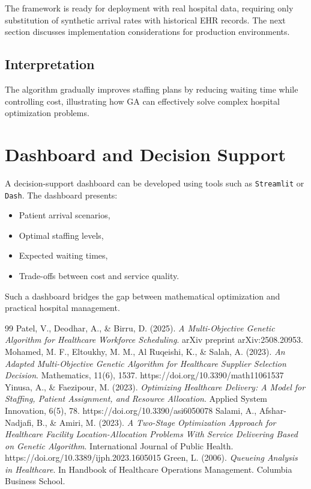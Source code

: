 \documentclass[12pt,a4paper]{article}
\begin{document}
	The framework is ready for deployment with real hospital data, requiring only substitution of synthetic arrival rates with historical EHR records. The next section discusses implementation considerations for production environments.
	
	\subsection{Interpretation}
	
	The algorithm gradually improves staffing plans by reducing waiting time while controlling cost, illustrating how GA can effectively solve complex hospital optimization problems.
	
	\section{Dashboard and Decision Support}
	
	A decision-support dashboard can be developed using tools such as \texttt{Streamlit} or \texttt{Dash}. The dashboard presents:
	\begin{itemize}
		\item Patient arrival scenarios,
		\item Optimal staffing levels,
		\item Expected waiting times,
		\item Trade-offs between cost and service quality.
	\end{itemize}
	
	Such a dashboard bridges the gap between mathematical optimization and practical hospital management.
	
\begin{thebibliography}{99} 
	 Patel, V., Deodhar, A., \& Birru, D. (2025). \textit{A Multi-Objective Genetic Algorithm for Healthcare Workforce Scheduling}. arXiv preprint arXiv:2508.20953. 
	 Mohamed, M. F., Eltoukhy, M. M., Al Ruqeishi, K., \& Salah, A. (2023). \textit{An Adapted Multi-Objective Genetic Algorithm for Healthcare Supplier Selection Decision}. Mathematics, 11(6), 1537. https://doi.org/10.3390/math11061537 
	 Yinusa, A., \& Faezipour, M. (2023). \textit{Optimizing Healthcare Delivery: A Model for Staffing, Patient Assignment, and Resource Allocation}. Applied System Innovation, 6(5), 78. https://doi.org/10.3390/asi6050078 
	 Salami, A., Afshar-Nadjafi, B., \& Amiri, M. (2023). \textit{A Two-Stage Optimization Approach for Healthcare Facility Location-Allocation Problems With Service Delivering Based on Genetic Algorithm}. International Journal of Public Health. https://doi.org/10.3389/ijph.2023.1605015 
	 Green, L. (2006). \textit{Queueing Analysis in Healthcare}. In Handbook of Healthcare Operations Management. Columbia Business School. \end{thebibliography} 
	
\end{document}
